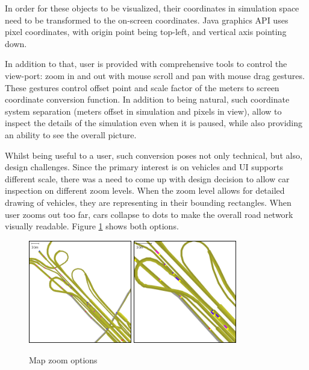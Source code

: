 In order for these objects to be visualized, their coordinates in simulation space need to be transformed to the on-screen coordinates. Java graphics API uses pixel coordinates, with origin point being top-left, and vertical axis pointing down.

In addition to that, user is provided with comprehensive tools to control the view-port: zoom in and out with mouse scroll and pan with mouse drag gestures. These gestures control offset point and scale factor of the meters to screen coordinate conversion function. In addition to being natural, such coordinate system separation (meters offset in simulation and pixels in view), allow to inspect the details of the simulation even when it is paused, while also providing an ability to see the overall picture.

Whilst being useful to a user, such conversion poses not only technical, but also, design challenges. Since the primary interest is on vehicles and UI supports different scale, there was a need to come up with design decision to allow car inspection on different zoom levels. When the zoom level allows for detailed drawing of vehicles, they are representing in their bounding rectangles. When user zooms out too far, cars collapse to dots to make the overall road network visually readable. Figure \ref{fig:mapZoomOptions} shows both options.

\begin{figure}[!h]
    \vspace{1.5em}
    \caption{Map zoom options}
    \label{fig:mapZoomOptions}
    \centering
    \includegraphics[width=0.4\textwidth]{figs/road/zoom_dots.png}
    \hspace{0.2em}
    \includegraphics[width=0.4\textwidth]{figs/road/zoom_cars.png}
    \vspace{1.5em}
\end{figure}

